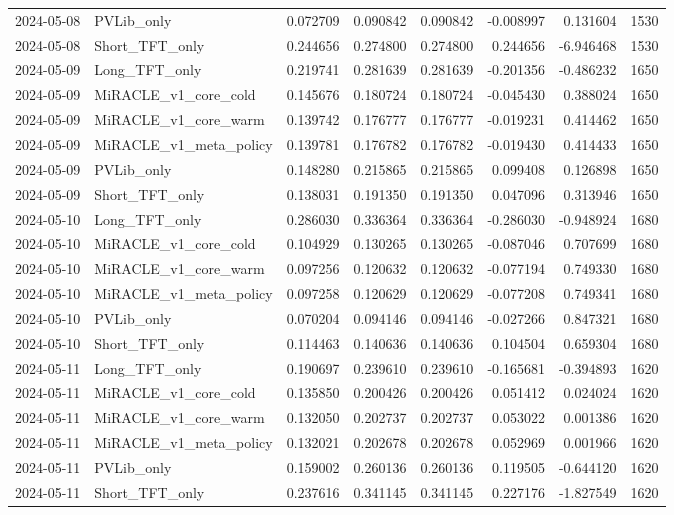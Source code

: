 \begin{tabular}{llrrrrrr}
2024-05-08 & PVLib_only & 0.072709 & 0.090842 & 0.090842 & -0.008997 & 0.131604 & 1530 \\
2024-05-08 & Short_TFT_only & 0.244656 & 0.274800 & 0.274800 & 0.244656 & -6.946468 & 1530 \\
2024-05-09 & Long_TFT_only & 0.219741 & 0.281639 & 0.281639 & -0.201356 & -0.486232 & 1650 \\
2024-05-09 & MiRACLE_v1_core_cold & 0.145676 & 0.180724 & 0.180724 & -0.045430 & 0.388024 & 1650 \\
2024-05-09 & MiRACLE_v1_core_warm & 0.139742 & 0.176777 & 0.176777 & -0.019231 & 0.414462 & 1650 \\
2024-05-09 & MiRACLE_v1_meta_policy & 0.139781 & 0.176782 & 0.176782 & -0.019430 & 0.414433 & 1650 \\
2024-05-09 & PVLib_only & 0.148280 & 0.215865 & 0.215865 & 0.099408 & 0.126898 & 1650 \\
2024-05-09 & Short_TFT_only & 0.138031 & 0.191350 & 0.191350 & 0.047096 & 0.313946 & 1650 \\
2024-05-10 & Long_TFT_only & 0.286030 & 0.336364 & 0.336364 & -0.286030 & -0.948924 & 1680 \\
2024-05-10 & MiRACLE_v1_core_cold & 0.104929 & 0.130265 & 0.130265 & -0.087046 & 0.707699 & 1680 \\
2024-05-10 & MiRACLE_v1_core_warm & 0.097256 & 0.120632 & 0.120632 & -0.077194 & 0.749330 & 1680 \\
2024-05-10 & MiRACLE_v1_meta_policy & 0.097258 & 0.120629 & 0.120629 & -0.077208 & 0.749341 & 1680 \\
2024-05-10 & PVLib_only & 0.070204 & 0.094146 & 0.094146 & -0.027266 & 0.847321 & 1680 \\
2024-05-10 & Short_TFT_only & 0.114463 & 0.140636 & 0.140636 & 0.104504 & 0.659304 & 1680 \\
2024-05-11 & Long_TFT_only & 0.190697 & 0.239610 & 0.239610 & -0.165681 & -0.394893 & 1620 \\
2024-05-11 & MiRACLE_v1_core_cold & 0.135850 & 0.200426 & 0.200426 & 0.051412 & 0.024024 & 1620 \\
2024-05-11 & MiRACLE_v1_core_warm & 0.132050 & 0.202737 & 0.202737 & 0.053022 & 0.001386 & 1620 \\
2024-05-11 & MiRACLE_v1_meta_policy & 0.132021 & 0.202678 & 0.202678 & 0.052969 & 0.001966 & 1620 \\
2024-05-11 & PVLib_only & 0.159002 & 0.260136 & 0.260136 & 0.119505 & -0.644120 & 1620 \\
2024-05-11 & Short_TFT_only & 0.237616 & 0.341145 & 0.341145 & 0.227176 & -1.827549 & 1620 \\

\end{tabular}
